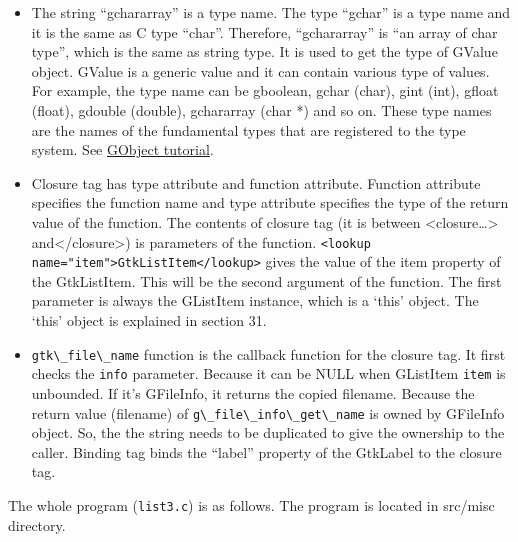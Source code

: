 \begin{itemize}
\tightlist
\item
  The string ``gchararray'' is a type name. The type ``gchar'' is a type
  name and it is the same as C type ``char''. Therefore, ``gchararray''
  is ``an array of char type'', which is the same as string type. It is
  used to get the type of GValue object. GValue is a generic value and
  it can contain various type of values. For example, the type name can
  be gboolean, gchar (char), gint (int), gfloat (float), gdouble
  (double), gchararray (char *) and so on. These type names are the
  names of the fundamental types that are registered to the type system.
  See
  \href{https://github.com/ToshioCP/Gobject-tutorial/blob/main/gfm/sec5.md\#gvalue}{GObject
  tutorial}.
\item
  Closure tag has type attribute and function attribute. Function
  attribute specifies the function name and type attribute specifies the
  type of the return value of the function. The contents of closure tag
  (it is between \textless closure\ldots\textgreater{}
  and\textless/closure\textgreater) is parameters of the function.
  \passthrough{\lstinline!<lookup name="item">GtkListItem</lookup>!}
  gives the value of the item property of the GtkListItem. This will be
  the second argument of the function. The first parameter is always the
  GListItem instance, which is a `this' object. The `this' object is
  explained in section 31.
\item
  \passthrough{\lstinline!gtk\_file\_name!} function is the callback
  function for the closure tag. It first checks the
  \passthrough{\lstinline!info!} parameter. Because it can be NULL when
  GListItem \passthrough{\lstinline!item!} is unbounded. If it's
  GFileInfo, it returns the copied filename. Because the return value
  (filename) of \passthrough{\lstinline!g\_file\_info\_get\_name!} is
  owned by GFileInfo object. So, the the string needs to be duplicated
  to give the ownership to the caller. Binding tag binds the ``label''
  property of the GtkLabel to the closure tag.
\end{itemize}

The whole program (\passthrough{\lstinline!list3.c!}) is as follows. The
program is located in src/misc directory.

